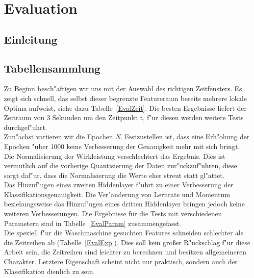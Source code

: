 \section{Evaluation}
\label{Evaluation}

\subsection{Einleitung}
\label{Einleitung}

\subsection{Tabellensammlung}
\label{Tabellensammlung}
Zu Beginn besch"aftigen wir uns mit der Auswahl des richtigen Zeitfensters. Es zeigt sich schnell, das selbst dieser begrenzte Featureraum bereits mehrere lokale Optima aufweist, siehe dazu Tabelle~\ref{EvalZeit}. Die besten Ergebnisse liefert der Zeitraum von 3 Sekunden um den Zeitpunkt t, f"ur diesen werden weitere Tests durchgef"uhrt.\\

Zun"achst variieren wir die Epochen \textit{N}. Festzustellen ist, dass eine Erh"ohung der Epochen "uber 1000 keine Verbesserung der Genauigkeit mehr mit sich bringt. Die Normalisierung der Wirkleistung verschlechtert das Ergebnis. Dies ist vermutlich auf die vorherige Quantisierung der Daten zur"uckzuf"uhren, diese sorgt daf"ur, dass die Normalisierung die Werte eher streut statt gl"attet. \\
Das Hinzuf"ugen eines zweiten Hiddenlayer f"uhrt zu einer Verbesserung der Klassifikationsgenauigkeit. Die Ver"anderung von Lernrate und Momentum beziehungsweise das Hinzuf"ugen eines dritten Hiddenlayer bringen jedoch keine weiteren Verbesserungen. Die Ergebnisse für die Tests mit verschiedenen Parametern sind in Tabelle~\ref{EvalParam} zusammengefasst.\\

Die speziell f"ur die Waschmaschine gesuchten Features schneiden schlechter als die Zeitreihen ab (Tabelle~\ref{EvalExp}). Dies soll kein gro{\ss}er R"uckschlag f"ur diese Arbeit sein, die Zeitreihen sind leichter zu berechnen und besitzen allgemeineren Charakter. Letztere Eigenschaft scheint nicht nur praktisch, sondern auch der Klassifikation dienlich zu sein.\\

